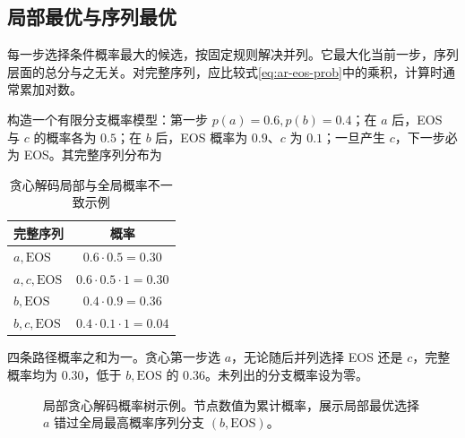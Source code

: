 \documentclass[../textbook.tex]{subfiles}
\begin{document}
\subsection{局部最优与序列最优}
\begin{example}
每一步选择条件概率最大的候选，按固定规则解决并列。它最大化当前一步，序列层面的总分与之无关。对完整序列，应比较式\eqref{eq:ar-eos-prob}中的乘积，计算时通常累加对数。

构造一个有限分支概率模型：第一步 $p(a)=0.6,p(b)=0.4$；在 $a$ 后，EOS 与 $c$ 的概率各为 $0.5$；在 $b$ 后，EOS 概率为 $0.9$、$c$ 为 $0.1$；一旦产生 $c$，下一步必为 EOS。其完整序列分布为
\begin{table}[htbp]
\centering
\caption{贪心解码局部与全局概率不一致示例}\label{tab:greedy-failure}
\begin{tabular}{lc}
\toprule
完整序列 & 概率\\\midrule
$a,\mathrm{EOS}$ & $0.6\cdot0.5=0.30$\\
$a,c,\mathrm{EOS}$ & $0.6\cdot0.5\cdot1=0.30$\\
$b,\mathrm{EOS}$ & $0.4\cdot0.9=0.36$\\
$b,c,\mathrm{EOS}$ & $0.4\cdot0.1\cdot1=0.04$\\
\bottomrule
\end{tabular}
\end{table}
四条路径概率之和为一。贪心第一步选 $a$，无论随后并列选择 EOS 还是 $c$，完整概率均为 $0.30$，低于 $b,\mathrm{EOS}$ 的 $0.36$。未列出的分支概率设为零。

\begin{figure}[htbp]
\centering
{}
\caption[局部贪心解码概率树示例]{局部贪心解码概率树示例。节点数值为累计概率，展示局部最优选择 $a$ 错过全局最高概率序列分支 $(b, \mathrm{EOS})$。}\label{fig:ar-beam-tree}
\end{figure}
\end{example}
\end{document}
